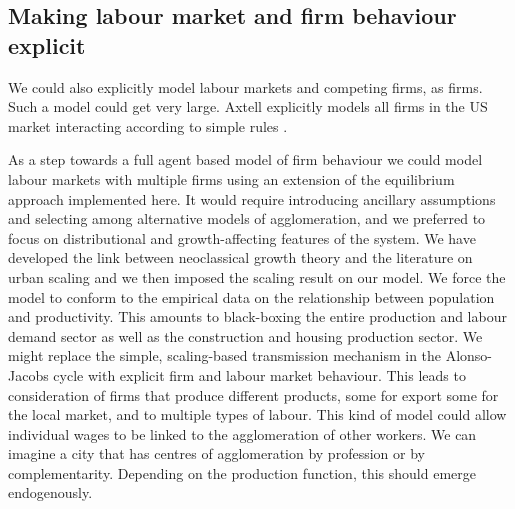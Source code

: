 \subsection{Making labour market and firm behaviour explicit} 

We could also explicitly model labour markets and competing firms, as firms.
Such a  model could get very large. Axtell explicitly models all firms in the US market interacting according to simple rules \cite{axtellDynamicsFirmsData2024}. 







As a step towards a full agent based model of firm behaviour we could model labour markets with multiple firms using an extension of the equilibrium approach implemented here. %
It would require introducing ancillary assumptions and selecting among alternative models of agglomeration, and we preferred to focus on distributional and growth-affecting features of the system. We have  developed the link between neoclassical growth theory and the literature on urban scaling \cite{bettencourtIntroductionUrbanScience2021} and  we then imposed the scaling result on our model.  We force the model to conform to the empirical data on the relationship between population and productivity. This amounts to black-boxing the entire production and labour demand sector as well as the construction and housing production sector. 
We might replace the simple, scaling-based transmission mechanism in the Alonso-Jacobs cycle with explicit firm and labour market behaviour. %
This leads to consideration of firms that produce different products, some for export some for the local market, and to multiple types of labour. This kind of model could allow individual wages to be linked to the agglomeration of other workers. %
We can imagine a city that has centres of agglomeration by profession or by complementarity. Depending on the production function, this should emerge endogenously. 

